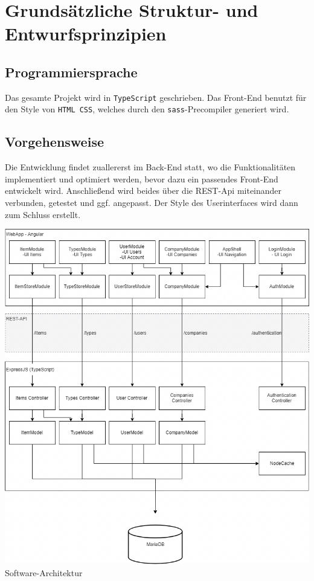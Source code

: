 \documentclass[11pt,a4paper]{report}
\begin{document}
	\section{Grundsätzliche Struktur- und Entwurfsprinzipien}
	\subsection{Programmiersprache}
	Das gesamte Projekt wird in \texttt{TypeScript} geschrieben. Das Front-End benutzt für den Style von \texttt{HTML CSS}, welches durch den \texttt{sass}-Precompiler generiert wird.
	
	\subsection{Vorgehensweise}
	Die Entwicklung findet zuallererst im Back-End statt, wo die Funktionalitäten implementiert und optimiert werden, bevor dazu ein passendes Front-End entwickelt wird. Anschließend wird beides über die REST-Api miteinander verbunden, getestet und ggf. angepasst. Der Style des Userinterfaces wird dann zum Schluss erstellt.
	\clearpage
	
	\begin{center}
		\includegraphics[scale=0.5]{architecture.png}\\
		Software-Architektur
	\end{center}
	
\end{document}
